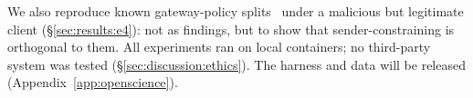 We also reproduce known gateway-policy splits~\cite{p2:xvnpw2021kong,p2:zhang2025uabscan}
under a malicious but legitimate client (\S\ref{sec:results:e4}): not as
findings, but to show that sender-constraining is orthogonal to them. All
experiments ran on local containers; no third-party system was tested
(\S\ref{sec:discussion:ethics}). The harness and data will be released
(Appendix~\ref{app:openscience}).

